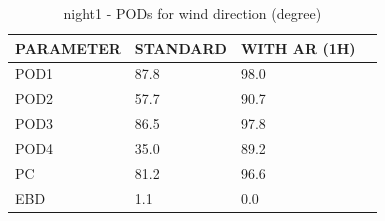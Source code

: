 \begin{table}[p!]
\begin{center}
\begin{tabular}{|l|l|l|l|}
\hline
\multicolumn{1}{|c|}{\cellcolor[HTML]{C0C0C0}\textbf{PARAMETER}} & \multicolumn{1}{c|}{\cellcolor[HTML]{C0C0C0}\textbf{STANDARD}} & \multicolumn{1}{c|}{\cellcolor[HTML]{C0C0C0}\textbf{WITH AR (1H)}} \\
\hline
\cellcolor[HTML]{C0C0C0}POD1  & 87.8      & 98.0     \\
\cellcolor[HTML]{C0C0C0}POD2  & 57.7      & 90.7     \\
\cellcolor[HTML]{C0C0C0}POD3  & 86.5      & 97.8     \\
\cellcolor[HTML]{C0C0C0}POD4  & 35.0      & 89.2     \\
\cellcolor[HTML]{C0C0C0}PC    & 81.2        & 96.6       \\
\cellcolor[HTML]{C0C0C0}EBD   & 1.1       & 0.0      \\
\hline
\end{tabular}
\caption{night1 - PODs for wind direction (degree)}
\label{tab:podwd:night1}
\end{center}
\end{table}
